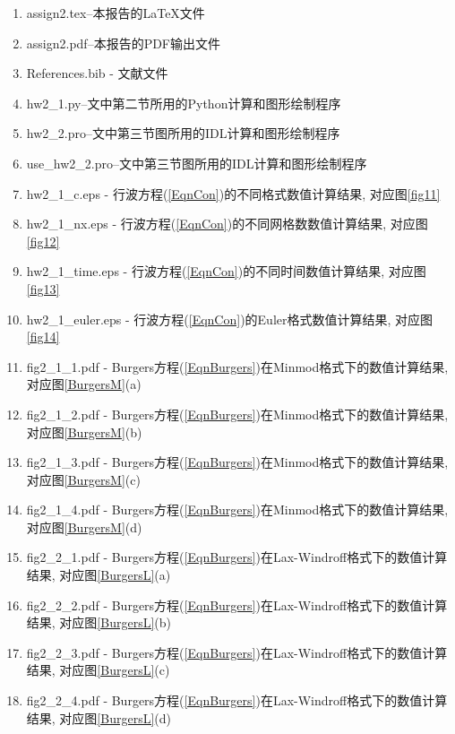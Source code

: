 \documentclass[10.5pt
]{article}
\begin{document}
\begin{enumerate}
\item
assign2.tex--本报告的\LaTeX 文件
\item
assign2.pdf--本报告的PDF输出文件
\item
References.bib - 文献文件
\item 
hw2\_1.py--文中第二节所用的Python计算和图形绘制程序
\item
hw2\_2.pro--文中第三节图所用的IDL计算和图形绘制程序
\item
use\_hw2\_2.pro--文中第三节图所用的IDL计算和图形绘制程序
\item
hw2\_1\_c.eps - 行波方程(\ref{EqnCon})的不同格式数值计算结果, 对应图\ref{fig11}
\item
hw2\_1\_nx.eps - 行波方程(\ref{EqnCon})的不同网格数数值计算结果, 对应图\ref{fig12}
\item
hw2\_1\_time.eps - 行波方程(\ref{EqnCon})的不同时间数值计算结果, 对应图\ref{fig13}
\item
hw2\_1\_euler.eps - 行波方程(\ref{EqnCon})的Euler格式数值计算结果, 对应图\ref{fig14}

\item
fig2\_1\_1.pdf - Burgers方程(\ref{EqnBurgers})在Minmod格式下的数值计算结果, 对应图\ref{BurgersM}(a)
\item
fig2\_1\_2.pdf - Burgers方程(\ref{EqnBurgers})在Minmod格式下的数值计算结果, 对应图\ref{BurgersM}(b)
\item
fig2\_1\_3.pdf - Burgers方程(\ref{EqnBurgers})在Minmod格式下的数值计算结果, 对应图\ref{BurgersM}(c)
\item
fig2\_1\_4.pdf - Burgers方程(\ref{EqnBurgers})在Minmod格式下的数值计算结果, 对应图\ref{BurgersM}(d)
\item
fig2\_2\_1.pdf - Burgers方程(\ref{EqnBurgers})在Lax-Windroff格式下的数值计算结果, 对应图\ref{BurgersL}(a)
\item
fig2\_2\_2.pdf - Burgers方程(\ref{EqnBurgers})在Lax-Windroff格式下的数值计算结果, 对应图\ref{BurgersL}(b)
\item
fig2\_2\_3.pdf - Burgers方程(\ref{EqnBurgers})在Lax-Windroff格式下的数值计算结果, 对应图\ref{BurgersL}(c)
\item
fig2\_2\_4.pdf - Burgers方程(\ref{EqnBurgers})在Lax-Windroff格式下的数值计算结果, 对应图\ref{BurgersL}(d)
\end{enumerate}





\end{document}
